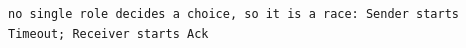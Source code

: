 \begin{lstlisting}[language={}]
no single role decides a choice, so it is a race: Sender starts Timeout; Receiver starts Ack
\end{lstlisting}
